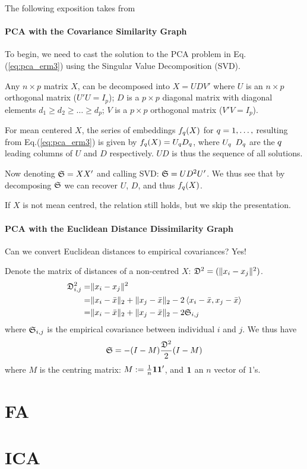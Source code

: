 \documentclass[12pt,a4paper]{article}
\begin{document}
The following exposition takes from \cite[Section 18.5.2]{hastie_elements_2003}


\paragraph{PCA with the Covariance Similarity Graph}
To begin, we need to cast the solution to the PCA problem in Eq.(\ref{eq:pca_erm3}) using the Singular Value Decomposition (SVD).

\begin{definition}[SVD]
	Any $n \times p$ matrix $X$, can be decomposed into $X=UDV'$ where 
	$U$ is an $n \times p$ orthogonal matrix ($U'U=I_p$); 
	$D$ is a $p \times p$ diagonal matrix with diagonal elements $d_1 \geq d_2 \geq \dots \geq d_p$;
	$V$ is a $p \times p$ orthogonal matrix ($V'V=I_p$).
\end{definition}

For mean centered $X$, the series of embeddings $f_q(X)$ for $\rank=1,\dots,\pagebreak$ resulting from Eq.(\ref{eq:pca_erm3}) is given by $f_q(X)=U_q D_q$, where $U_q$ $D_q$ are the $q$ leading columns of $U$ and $D$ respectively. $UD$ is thus the sequence of all solutions.

Now denoting $\mathfrak{S}=XX'$ and calling SVD: $\mathfrak{S}=U D^2 U'$. 
We thus see that by decomposing $\mathfrak{S}$ we can recover $U$, $D$, and thus $f_q(X)$.

If $X$ is not mean centred, the relation still holds, but we skip the presentation.


\paragraph{PCA with the Euclidean Distance Dissimilarity Graph}
Can we convert Euclidean distances to empirical covariances? Yes!

Denote the matrix of distances of a non-centred $X$: $\mathfrak{D}^2=(\Vert x_i-x_j \Vert^2)$.
\begin{align}
\mathfrak{D}^2_{i,j} =& \Vert x_i-x_j \Vert^2 \\
=& \Vert x_i-\bar{x} \Vert_2+\Vert x_j-\bar{x} \Vert_2-2 \left< x_i-\bar{x},x_j-\bar{x} \right> \\
=& \Vert x_i-\bar{x} \Vert_2+\Vert x_j-\bar{x} \Vert_2-2 \mathfrak{S}_{i,j}
\end{align}
where $\mathfrak{S}_{i,j}$ is the empirical covariance between individual $i$ and $j$.
We thus have 
\begin{align}
\mathfrak{S}= - (I-M) \frac{\mathfrak{D}^2}{2} (I-M)
\end{align}
where $M$ is the centring matrix: $M:= \frac{1}{n} \textbf{1} \textbf{1}'$, and $\textbf{1}$ an $n$ vector of $1$'s.







\section{FA}




\section{ICA}






\newpage


\end{document}

